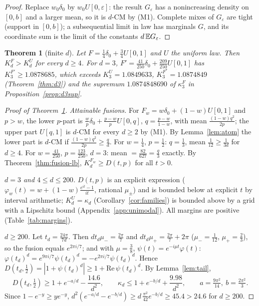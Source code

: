 \documentclass[11pt]{amsart}
\newtheorem{theorem}{Theorem}[section]\newtheorem{proposition}[theorem]{Proposition}\newtheorem{lemma}[theorem]{Lemma}
\theoremstyle{definition}\newtheorem{definition}[theorem]{Definition}\theoremstyle{remark}\newtheorem{remark}[theorem]{Remark}
\begin{document}
\begin{proof}Replace $w_0\delta_0$ by $w_0U[0,\varepsilon]$: the result $G_\varepsilon$ has a nonincreasing density on $[0,b]$ and a larger mean, so it is $d$-CM by (M1). Complete mixes of
$G_\varepsilon$ are tight (support in $[0,b]$); a subsequential limit in law has marginals $G$, and its coordinate sum is the limit of the constants $d\,\mathbb E G_\varepsilon$.\end{proof}
\begin{theorem}[finite $d$]\label{thm:finite-d}
Let $F=\frac14\delta_0+\frac34U[0,1]$ and $U$ the uniform law. Then $K_d^F>K_d^U$ for every $d\ge4$. For $d=3$, $F'=\frac{41}{250}\delta_0+\frac{209}{250}U[0,1]$ has
$K_3^{F'}\ge1.0878685$, which exceeds $K_3^U=1.0849633$, $K_3^{F^*}=1.0874849$ (Theorem~\ref{thm:d3}) and the supremum $1.0874848690$ of $\kappa_3^F$ in
Proposition~\ref{prop:d3sup}.
\end{theorem}
\begin{proof}[Proof of Theorem~\ref{thm:finite-d}]\emph{Attainable fusions.} For $F_w=w\delta_0+(1-w)U[0,1]$ and $p>w$, the lower $p$-part is $\frac wp\delta_0+\frac{p-w}pU[0,q]$, $q=\frac{p-w}{1-w}$, with mean $\frac{(1-w)q^2}{2p}$;
the upper part $U[q,1]$ is $d$-CM for every $d\ge2$ by (M1). By Lemma~\ref{lem:atom} the lower part is $d$-CM if $\frac{(1-w)q^2}{2p}\ge\frac qd$. For $w=\frac14$, $p=\frac12$: $q=\frac13$, mean $\frac1{12}\ge\frac1{3d}$ for
$d\ge4$. For $w=\frac{41}{250}$, $p=\frac{123}{250}$, $d=3$: mean $=\frac{82}{627}=\frac q3$ exactly. By Theorem~\ref{thm:fusion-lb}, $K_d^{F_w}\ge D(t,p)$ for all $t>0$.

\emph{$d=3$ and $4\le d\le200$.} $D(t,p)$ is an explicit expression ($\varphi_w(t)=w+(1-w)\frac{e^{it}-1}{it}$, rational $\mu_\pm$) and is bounded below at explicit $t$ by interval
arithmetic; $K_d^U=\kappa_d$ (Corollary~\ref{cor:families}) is bounded above by a grid with a Lipschitz bound (Appendix~\ref{app:unimodal}). All margins are positive (Table~\ref{tab:margins}).

\emph{$d\ge200$.} Let $t_d=\frac{24\pi}{7d}$. Then $dt_d\mu_-=\frac{2\pi}7$ and $dt_d\mu_+=\frac{2\pi}7+2\pi$ ($\mu_-=\frac1{12}$, $\mu_+=\frac23$), so the fusion equals $e^{2\pi i/7}$; and with $\mu=\frac38$,
$\psi(t)=e^{-i\mu t}\varphi(t)$: $\varphi(t_d)^d=e^{9\pi i/7}\psi(t_d)^d=-e^{2\pi i/7}\psi(t_d)^d$. Hence $D(t_d,\frac12)=|1+\psi(t_d)^d|\ge1+\mathrm{Re}\,\psi(t_d)^d$. By Lemma~\ref{lem:tail},
\[D(t_d,\tfrac12)\ge1+e^{-a/d}-\frac{14.6}{d^2},\qquad \kappa_d\le1+e^{-b/d}+\frac{9.98}{d^2},\qquad a=\tfrac{9\pi^2}{14},\ b=\tfrac{2\pi^2}3 .\]
Since $1-e^{-y}\ge ye^{-y}$, $d^2(e^{-a/d}-e^{-b/d})\ge d\,\frac{\pi^2}{42}e^{-b/d}\ge45.4>24.6$ for $d\ge200$.\end{proof}
\end{document}
